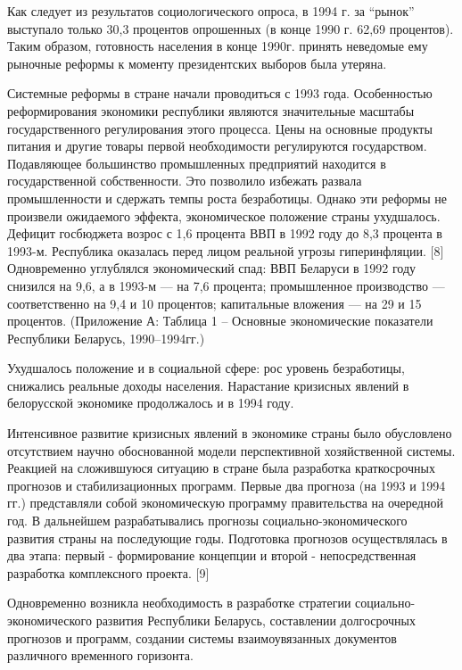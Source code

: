 \documentclass[14pt,a4paper]{article}
\begin{document}
    \par
    Как следует из результатов социологического опроса, в 1994 г. за ``рынок'' выступало только 30,3 процентов опрошенных (в конце 1990 г. 62,69 процентов).
    Таким образом, готовность населения в конце 1990г. принять неведомые ему рыночные реформы к моменту президентских выборов была утеряна.
    \par
    Системные реформы в стране начали проводиться с 1993 года.
    Особенностью реформирования экономики республики являются значительные масштабы государственного регулирования этого процесса.
    Цены на основные продукты питания и другие товары первой необходимости регулируются государством.
    Подавляющее большинство промышленных предприятий находится в государственной собственности.
    Это позволило избежать развала промышленности и сдержать темпы роста безработицы.
    Однако эти реформы не произвели ожидаемого эффекта, экономическое положение страны ухудшалось.
    Дефицит госбюджета возрос с 1,6 процента ВВП в 1992 году до 8,3 процента в 1993-м.
    Республика оказалась перед лицом реальной угрозы гиперинфляции. [8]
    Одновременно углублялся экономический спад: ВВП Беларуси в 1992 году снизился на 9,6, а в 1993-м — на 7,6 процента; промышленное производство — соответственно на 9,4 и 10 процентов; капитальные вложения — на 29 и 15 процентов. (Приложение А: Таблица 1 – Основные экономические показатели Республики Беларусь, 1990--1994гг.)
    \\
    \par
    Ухудшалось положение и в социальной сфере: рос уровень безработицы, снижались реальные доходы населения.
    Нарастание кризисных явлений в белорусской экономике продолжалось и в 1994 году.
    \par
    Интенсивное развитие кризисных явлений в экономике страны было обусловлено отсутствием научно обоснованной модели перспективной хозяйственной системы.
    Реакцией на сложившуюся ситуацию в стране была разработка краткосрочных прогнозов и стабилизационных программ. Первые два прогноза (на 1993 и 1994 гг.) представляли собой экономическую программу правительства на очередной год.
    В дальнейшем разрабатывались прогнозы социально-экономического развития страны на последующие годы.
    Подготовка прогнозов осуществлялась в два этапа: первый - формирование концепции и второй - непосредственная разработка комплексного проекта. [9]
    \par
    Одновременно возникла необходимость в разработке стратегии социально- экономического развития Республики Беларусь, составлении долгосрочных прогнозов и программ, создании системы взаимоувязанных документов различного временного горизонта.
\end{document}
